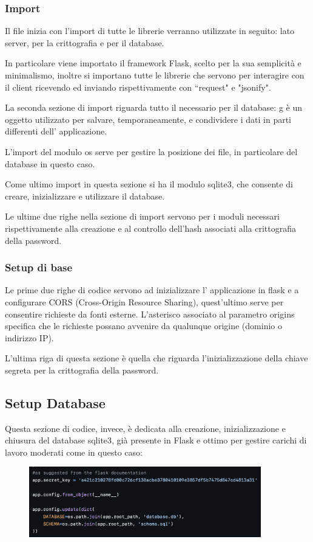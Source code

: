 \documentclass{article}
\begin{document}
\subsubsection{Import}
Il file inizia con l’import di tutte le librerie verranno utilizzate in seguito: lato server, per la crittografia e per il database.

In particolare viene importato il framework Flask, scelto per la sua semplicità e minimalismo, inoltre si importano tutte le librerie che servono per interagire con il client ricevendo ed inviando rispettivamente con “request" e "jsonify".

La seconda sezione di import riguarda tutto il necessario per il database: g è un oggetto utilizzato per salvare, temporaneamente, e condividere i dati in parti differenti dell' applicazione.

L’import del modulo os serve per gestire la posizione dei file, in particolare del database in questo caso.

Come ultimo import in questa sezione si ha il modulo sqlite3, che consente di creare, inizializzare e utilizzare il database.


Le ultime due righe nella sezione di import servono per i moduli necessari rispettivamente alla creazione e al controllo dell’hash associati alla crittografia della password. 

\subsubsection{Setup di base}
Le prime due righe di codice servono ad inizializzare l' applicazione in flask e a configurare CORS (Cross-Origin Resource Sharing), quest'ultimo serve per consentire richieste da fonti esterne. 
L’asterisco associato al parametro origins specifica che le richieste possano avvenire da qualunque origine (dominio o indirizzo IP).

L’ultima riga di questa sezione è quella che riguarda l’inizializzazione della chiave segreta per la crittografia della password.

\subsection{Setup Database}
Questa sezione di codice, invece, è dedicata alla creazione, inizializzazione e chiusura del database sqlite3, già presente in Flask e ottimo per gestire carichi di lavoro moderati come in questo caso:
\begin{figure}[H]
    \centering
    \includegraphics[width=0.9\textwidth]{images/setup_database1.png}
\end{figure}
\end{document}
